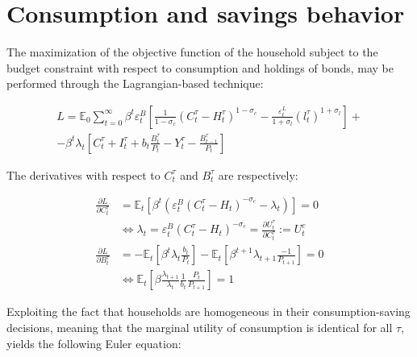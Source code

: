 \documentclass{pracamgr}
\numberwithin{equation}{section}
\begin{document}
\section*{Consumption and savings behavior}

The maximization of the objective function of the household subject to the budget constraint with respect to consumption and holdings of bonds, may be performed through the Lagrangian-based technique:

\begin{equation}
\begin{split}
L = \mathbb{E}_{0} \sum\limits_{t=0}^{\infty} \beta^{t} \varepsilon_{t}^{B} \left[ \frac{1}{1-\sigma_{c}} \left( C_{t}^{\tau} - H_{t}^{\tau} \right)^{1-\sigma_{c}} - \frac{\varepsilon_{t}^{L}}{1+\sigma_{l}} \left( l_{t}^{\tau} \right)^{1+\sigma_{l}} \right] + \\
- \beta^{t} \lambda_{t} \left[ C_{t}^{\tau} + I_{t}^{\tau} + b_{t} \frac{B_{t}^{\tau}}{P_{t}} - Y_{t}^{\tau} - \frac{B_{t-1}^{\tau}}{P_{t}} \right]
\end{split}
\end{equation}

The derivatives with respect to $C_{t}^{\tau}$ and $B_{t}^{\tau}$ are respectively:

\begin{align}
\frac{\partial L}{\partial C_{t}^{\tau}} &= \mathbb{E}_{t} \left[ \beta^{t} \left( \varepsilon_{t}^{B} (
C_{t}^{\tau} - H_{t} )^{-\sigma_{c}} - \lambda_{t} \right) \right]  = 0  \nonumber \\ 
& \iff \lambda_{t} =  \varepsilon_{t}^{B} (C_{t}^{\tau} - H_{t} )^{-\sigma_{c}} = \frac{\partial U_{t}^{\tau}}{\partial C_{t}^{\tau}} := U_{t}^{c} \label{FOC_C} \\
\frac{\partial L}{\partial B_{t}^{\tau}} &= -\mathbb{E}_{t} \left[ \beta^{t} \lambda_{t} \frac{b_{t}}{P_{t}} \right] - \mathbb{E}_{t} \left[ \beta^{t+1} \lambda_{t+1} \frac{-1}{P_{t+1}} \right] = 0 \nonumber \\
& \iff \mathbb{E}_{t} \left[ \beta \frac{\lambda_{t+1}}{\lambda_{t}} \frac{1}{b_{t}} \frac{P_{t}}{P_{t+1}} \right] = 1 \label{FOC_B} 
\end{align}

Exploiting the fact that households are homogeneous in their consumption-saving decisions,  meaning that the marginal utility of consumption is identical for all $\tau$, yields the following Euler equation:
\end{document}
